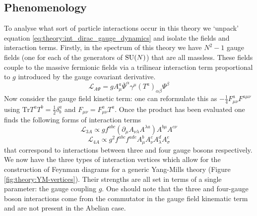 \subsection{Phenomenology}
To analyse what sort of particle interactions occur in this theory we `unpack' equation \ref{eq:theory:int_dirac_gauge_dynamics} and isolate the fields and interaction terms. 
Firstly, in the spectrum of this theory we have $N^{2}-1$ gauge fields (one for each of the generators of ${\mathrm{SU}(N)}$) that are all massless. 
These fields couple to the massive fermionic fields via a trilinear interaction term proportional to $g$ introduced by the gauge covariant derivative.
\begin{equation}
    \mathcal{L}_{{A}\Psi} = gA_{\mu}^{a}\bar{\Psi}^{\alpha}\gamma^{\mu}(T^{a})_{\alpha\beta}\Psi^{\beta}
\end{equation}
Now consider the gauge field kinetic term: one can reformulate this as $-\frac{1}{4}F^{a}_{\mu\nu}F^{a\mu\nu}$ using $\mathrm{Tr}T^{a}T^{b} = \frac{1}{2}\delta^{a}_{b}$ and $F_{\mu\nu} = F^{a}_{\mu\nu}T^{a}$. 
Once the product has been evaluated one finds the following forms of interaction terms
\begin{equation}
    \mathcal{L}_{3A} \propto gf^{abc}(\partial_{\mu}A_{\nu\lambda}A^{\lambda{a}})A^{b\mu}A^{c\nu} 
\end{equation}
%
\begin{equation}
    \mathcal{L}_{4A} \propto g^{2}f^{abc}f^{ade}A_{\mu}^{b}A_{\nu}^{c}A_{\lambda}^{d}A_{\sigma}^{e}
\end{equation}
%
that correspond to interactions between three and four gauge bosons respectively. 
We now have the three types of interaction vertices which allow for the construction of Feynman diagrams for a generic Yang-Mills theory (Figure \ref{fig:theory:YM-vertices}). 
Their strengths are all set in terms of a single parameter: the gauge coupling $g$.
One should note that the three and four-gauge boson interactions come from the commutator in the gauge field kinematic term and are not present in the Abelian case. 

